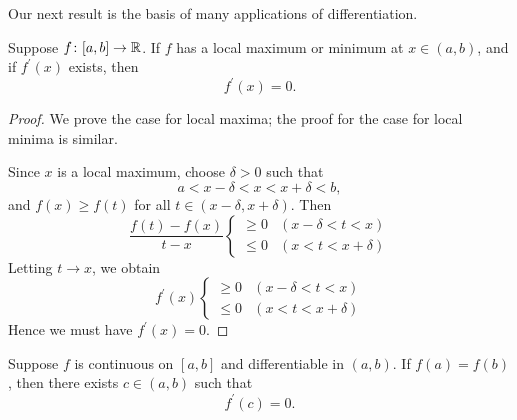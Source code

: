 \begin{figure}[H]
\centering
{}
\end{figure}

Our next result is the basis of many applications of differentiation. 

\begin{lemma}
Suppose $f\colon [a,b]\to\mathbb R$. If $f$ has a local maximum or minimum at $x\in(a,b)$, and if $f^\prime(x)$ exists, then
\[f^\prime(x)=0.\]
\end{lemma}

\begin{proof}
We prove the case for local maxima; the proof for the case for local minima is similar.

Since $x$ is a local maximum, choose $\delta>0$ such that
\[a<x-\delta<x<x+\delta<b,\]
and $f(x)\ge f(t)$ for all $t\in(x-\delta,x+\delta)$. Then
\[\frac{f(t)-f(x)}{t-x}
\begin{cases}
\ge0&(x-\delta<t<x)\\
\le0&(x<t<x+\delta)
\end{cases}
\]
Letting $t\to x$, we obtain
\[f^\prime(x)
\begin{cases}
\ge0&(x-\delta<t<x)\\
\le0&(x<t<x+\delta)
\end{cases}\]
Hence we must have $f^\prime(x)=0$.
\end{proof}

\begin{theorem}\label{thrm:rolle}
Suppose $f$ is continuous on $[a,b]$ and differentiable in $(a,b)$. If $f(a)=f(b)$, then there exists $c\in(a,b)$ such that 
\[f^\prime(c)=0.\]
\end{theorem}

